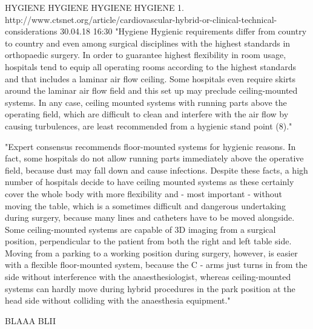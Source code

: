 	
	HYGIENE HYGIENE HYGIENE HYGIENE
	1. http://www.ctsnet.org/article/cardiovascular-hybrid-or-clinical-technical-considerations 30.04.18 16:30
	"Hygiene
	Hygienic requirements differ from country to country and even among surgical disciplines with the highest standards in orthopaedic surgery. In order to guarantee highest flexibility in room usage, hospitals tend to equip all operating rooms according to the highest standards and that includes a laminar air flow ceiling. Some hospitals even require skirts around the laminar air flow field and this set up may preclude ceiling-mounted systems. In any case, ceiling mounted systems with running parts above the operating field, which are difficult to clean and interfere with the air flow by causing turbulences, are least recommended from a hygienic stand point (8)."
	
	"Expert consensus recommends floor-mounted systems for hygienic reasons. In fact, some hospitals do not allow running parts immediately above the operative field, because dust may fall down and cause infections. Despite these facts, a high number of hospitals decide to have ceiling mounted systems as these certainly cover the whole body with more flexibility and - most important - without moving the table, which is a sometimes difficult and dangerous undertaking during surgery, because many lines and catheters have to be moved alongside.  Some ceiling-mounted systems are capable of 3D imaging from a surgical position, perpendicular to the patient from both the right and left table side. Moving from a parking to a working position during surgery, however, is easier with a flexible floor-mounted system, because the C - arms just turns in from the side without interference with the anaesthesiologist, whereas ceiling-mounted systems can hardly move during hybrid procedures in the park position at the head side without colliding with the anaesthesia equipment."
	
	BLAAA BLII





